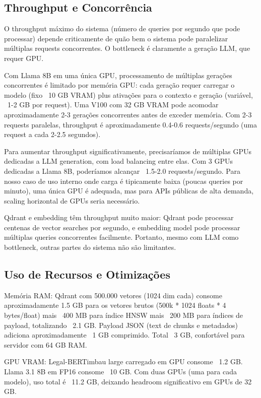 \documentclass[12pt,a4paper]{article}
\begin{document}
\subsection{Throughput e Concorrência}

O throughput máximo do sistema (número de queries por segundo que pode processar) depende criticamente de quão bem o sistema pode paralelizar múltiplas requests concorrentes. O bottleneck é claramente a geração LLM, que requer GPU.

Com Llama 8B em uma única GPU, processamento de múltiplas gerações concorrentes é limitado por memória GPU: cada geração requer carregar o modelo (fixo ~10 GB VRAM) plus ativações para o contexto e geração (variável, ~1-2 GB por request). Uma V100 com 32 GB VRAM pode acomodar aproximadamente 2-3 gerações concorrentes antes de exceder memória. Com 2-3 requests paralelas, throughput é aproximadamente 0.4-0.6 requests/segundo (uma request a cada 2-2.5 segundos).

Para aumentar throughput significativamente, precisaríamos de múltiplas GPUs dedicadas a LLM generation, com load balancing entre elas. Com 3 GPUs dedicadas a Llama 8B, poderíamos alcançar ~1.5-2.0 requests/segundo. Para nosso caso de uso interno onde carga é tipicamente baixa (poucas queries por minuto), uma única GPU é adequada, mas para APIs públicas de alta demanda, scaling horizontal de GPUs seria necessário.

Qdrant e embedding têm throughput muito maior: Qdrant pode processar centenas de vector searches por segundo, e embedding model pode processar múltiplas queries concorrentes facilmente. Portanto, mesmo com LLM como bottleneck, outras partes do sistema não são limitantes.

\subsection{Uso de Recursos e Otimizações}

Memória RAM: Qdrant com 500.000 vetores (1024 dim cada) consome aproximadamente 1.5 GB para os vetores brutos (500k * 1024 floats * 4 bytes/float) mais ~400 MB para índice HNSW mais ~200 MB para índices de payload, totalizando ~2.1 GB. Payload JSON (text de chunks e metadados) adiciona aproximadamente ~1 GB comprimido. Total ~3 GB, confortável para servidor com 64 GB RAM.

GPU VRAM: Legal-BERTimbau large carregado em GPU consome ~1.2 GB. Llama 3.1 8B em FP16 consome ~10 GB. Com duas GPUs (uma para cada modelo), uso total é ~11.2 GB, deixando headroom significativo em GPUs de 32 GB.
\end{document}
